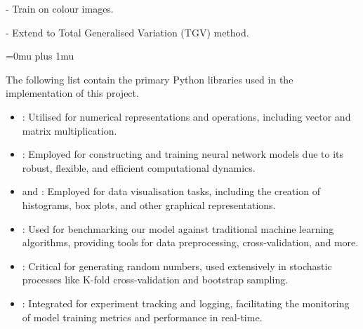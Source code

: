 \documentclass[12pt]{article}
\begin{document}
- Train on colour images.

- Extend to Total Generalised Variation (TGV) method.

\newpage



\Urlmuskip=0mu plus 1mu\relax
\printbibliography


The following list contain the primary Python libraries used in the implementation of this project.

\vspace{-6pt}

\begin{itemize}
\setlength\itemsep{-0.3em}
  \item {}: Utilised for numerical representations and operations, including vector and matrix multiplication.
  \item {}: Employed for constructing and training neural network models due to its robust, flexible, and efficient computational dynamics.
  \item {} and : Employed for data visualisation tasks, including the creation of histograms, box plots, and other graphical representations.
  \item {}: Used for benchmarking our model against traditional machine learning algorithms, providing tools for data preprocessing, cross-validation, and more.
  \item {}: Critical for generating random numbers, used extensively in stochastic processes like K-fold cross-validation and bootstrap sampling.
  \item {}: Integrated for experiment tracking and logging, facilitating the monitoring of model training metrics and performance in real-time.
\end{itemize}
\end{document}
